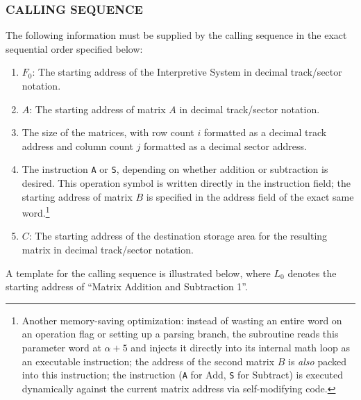 \documentclass{article}
\begin{document}
\subsubsection*{CALLING SEQUENCE}
The following information must be supplied by the calling sequence in the exact sequential order specified below:
\begin{enumerate}[label=\arabic*., leftmargin=1.5em, itemsep=2pt]
    \item $F_0$: The starting address of the Interpretive System in decimal track/sector notation.
    \item $A$: The starting address of matrix $A$ in decimal track/sector notation.
    \item The size of the matrices, with row count $i$ formatted as a decimal track address and column count $j$ formatted as a decimal sector address.
    \item The instruction \texttt{A} or \texttt{S}, depending on whether addition or subtraction is desired. This operation symbol is written directly in the instruction field; the starting address of matrix $B$ is specified in the address field of the exact same word.\footnote{Another memory-saving optimization: instead of wasting an entire word on an operation flag or setting up a parsing branch, the subroutine reads this parameter word at $\alpha+5$ and injects it directly into its internal math loop as an executable instruction; the address of the second matrix $B$ is \emph{also} packed into this instruction; the instruction (\texttt{A} for Add, \texttt{S} for Subtract) is executed dynamically against the current matrix address via self-modifying code.}
    \item $C$: The starting address of the destination storage area for the resulting matrix in decimal track/sector notation.
\end{enumerate}
A template for the calling sequence is illustrated below, where \texttt{$L_0$} denotes the starting address of ``Matrix Addition and Subtraction 1''.
\end{document}
